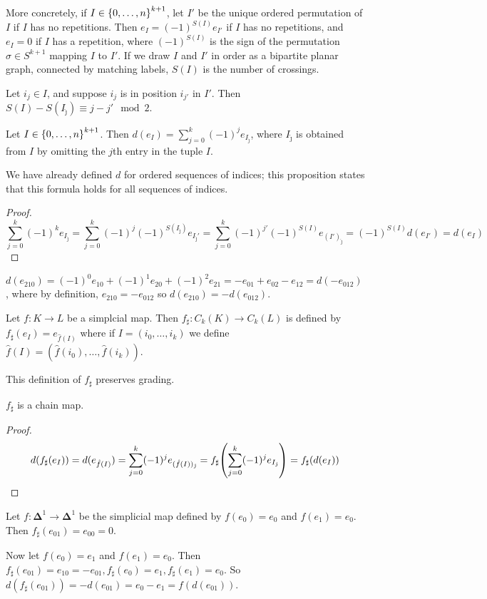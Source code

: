 More concretely, if \( I \in \qty{0, \dots, n}^{k+1} \), let \( I' \) be the unique ordered permutation of \( I \) if \( I \) has no repetitions.
Then \( e_I = (-1)^{S(I)} e_{I'} \) if \( I \) has no repetitions, and \( e_I = 0 \) if \( I \) has a repetition, where \( (-1)^{S(I)} \) is the sign of the permutation \( \sigma \in S^{k+1} \) mapping \( I \) to \( I' \).
If we draw \( I \) and \( I' \) in order as a bipartite planar graph, connected by matching labels, \( S(I) \) is the number of crossings.
\begin{lemma}
	Let \( i_j \in I \), and suppose \( i_j \) is in position \( i_{j'} \) in \( I' \).
	Then \( S(I) - S(I_{\hat\jmath}) \equiv j - j' \mod 2 \).
\end{lemma}
\begin{proposition}
	Let \( I \in \qty{0, \dots, n}^{k+1} \).
	Then \( d(e_I) = \sum_{j=0}^k (-1)^j e_{I_{\hat\jmath}} \), where \( I_{\hat\jmath} \) is obtained from \( I \) by omitting the \( j \)th entry in the tuple \( I \).
\end{proposition}
We have already defined \( d \) for ordered sequences of indices; this proposition states that this formula holds for all sequences of indices.
\begin{proof}
	\[ \sum_{j=0}^k (-1)^k e_{I_{\hat\jmath}} = \sum_{j=0}^k (-1)^j (-1)^{S(I_{\hat\jmath})} e_{I_{\hat\jmath}'} = \sum_{j=0}^k (-1)^{j'} (-1)^{S(I)} e_{(I')_{\hat\jmath}} = (-1)^{S(I)} d(e_{I'}) = d(e_I) \]
\end{proof}
\begin{example}
	\( d(e_{210}) = (-1)^0 e_{10} + (-1)^1 e_{20} + (-1)^2 e_{21} = -e_{01} + e_{02} - e_{12} = d(-e_{012}) \), where by definition, \( e_{210} = -e_{012} \) so \( d(e_{210}) = -d(e_{012}) \).
\end{example}
\begin{definition}
	Let \( f \colon K \to L \) be a simplcial map.
	Then \( f_\sharp \colon C_k(K) \to C_k(L) \) is defined by \( f_\sharp(e_I) = e_{\hat f(I)} \) where if \( I = (i_0, \dots, i_k) \) we define \( \hat f(I) = (\hat f(i_0), \dots, \hat f(i_k)) \).
\end{definition}
This definition of \( f_\sharp \) preserves grading.
\begin{proposition}
	\( f_\sharp \) is a chain map.
\end{proposition}
\begin{proof}
	\[ d(f_\sharp(e_I)) = d(e_{\hat f(I)}) = \sum_{j=0}^k (-1)^j e_{(\hat f(I))_{\hat \jmath}} = f_\sharp\qty(\sum_{j=0}^k (-1)^j e_{I_{\hat\jmath}}) = f_\sharp(d(e_I)) \]
\end{proof}
\begin{example}
	Let \( f \colon \bm\Delta^1 \to \bm\Delta^1 \) be the simplicial map defined by \( f(e_0) = e_0 \) and \( f(e_1) = e_0 \).
	Then \( f_\sharp(e_{01}) = e_{00} = 0 \).

	Now let \( f(e_0) = e_1 \) and \( f(e_1) = e_0 \).
	Then \( f_\sharp(e_{01}) = e_{10} = -e_{01}, f_\sharp(e_0) = e_1, f_\sharp(e_1) = e_0 \).
	So \( d(f_\sharp(e_{01})) = -d(e_{01}) = e_0 - e_1 = f(d(e_{01})) \).
\end{example}

